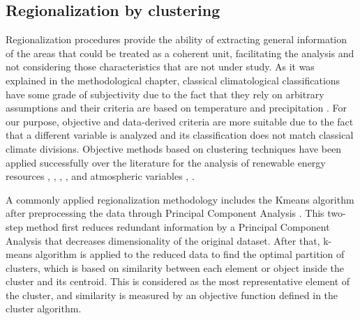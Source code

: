 \subsection{Regionalization by clustering}

Regionalization procedures provide the ability of extracting general information of the areas that could be treated as a coherent unit, facilitating the analysis and not considering those characteristics that are not under study. As it was explained in the methodological chapter, classical climatological classifications have some grade of subjectivity due to the fact that they rely on arbitrary assumptions \cite*{Kottek2006} and their criteria are based on temperature and precipitation \cite*{trewartha1980koppen}. For our purpose, objective and data-derived criteria are more suitable due to the fact that a different variable is analyzed and its classification does not match classical climate divisions. Objective methods based on clustering techniques have been applied successfully over the literature for the analysis of renewable energy resources \cite*{Polo2015}, \cite*{Zagouras2013}, \cite*{Zagouras2014}, \cite*{Zagouras2014b}, \cite*{gomez2015characterization} and atmospheric variables \cite*{Argueso2011}, \cite*{garcia2012seasonal}. 


A commonly applied regionalization methodology includes the Kmeans algorithm after preprocessing the data through Principal Component Analysis \cite*{Ding2004}. This two-step method first reduces redundant information by a Principal Component Analysis that decreases dimensionality of the original dataset. After that, k-means algorithm is applied to the reduced data to find the optimal partition of clusters, which is based on similarity between each element or object inside the cluster and its centroid. This is considered as the most representative element of the cluster, and similarity is measured by an objective function defined in the cluster algorithm.

